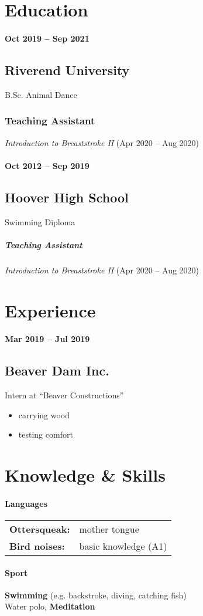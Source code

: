 \section{Education}
\paragraph{Oct 2019 -- Sep 2021}

\subsection{Riverend University} 
B.Sc. Animal Dance 

\subsubsection{Teaching Assistant}
\textit{Introduction to Breaststroke II} (Apr 2020 -- Aug 2020)

\paragraph{Oct 2012 -- Sep 2019}

\subsection{Hoover High School}  
Swimming Diploma 

\subparagraph{Teaching Assistant}
\textit{Introduction to Breaststroke II} (Apr 2020 -- Aug 2020)


\section{Experience}

\paragraph{Mar 2019 -- Jul 2019}
\subsection{Beaver Dam Inc.}

Intern at \enquote{Beaver Constructions}
\begin{itemize}
    \item   carrying wood
    \item   testing comfort
\end{itemize}


\section{Knowledge \& Skills}

\paragraph{Languages}
\begin{tabular}{@{}>{\bfseries}ll}
Ottersqueak: & mother tongue\\
Bird noises: & basic knowledge (A1)
\end{tabular}


 \paragraph{Sport}
\textbf{Swimming} (e.g. backstroke, diving, catching fish)\\
Water polo,  \textbf{Meditation}